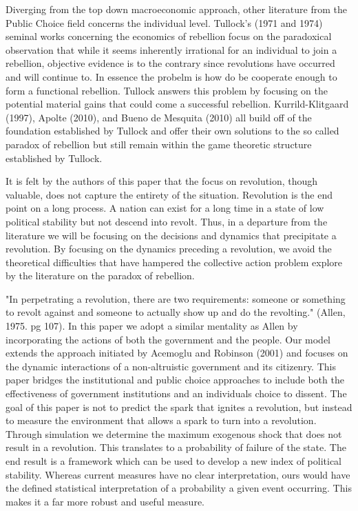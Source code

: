 \documentclass[12pt]{article}
\begin{document}
\begin{spacing}{1.5}
Diverging from the top down macroeconomic approach, other literature from the Public Choice field concerns the individual level. Tullock's (1971 and 1974) seminal works concerning the economics of rebellion focus on the paradoxical observation that while it seems inherently irrational for an individual to join a rebellion, objective evidence is to the contrary since revolutions have occurred and will continue to. In essence the probelm is how do be cooperate enough to form a functional rebellion. Tullock answers this problem by focusing on the potential material gains that could come a successful rebellion. Kurrild-Klitgaard (1997), Apolte (2010), and Bueno de Mesquita (2010) all build off of the foundation established by Tullock and offer their own solutions to the so called paradox of rebellion but still remain within the game theoretic structure established by Tullock. 

It is felt by the authors of this paper that the focus on revolution, though valuable, does not capture the entirety of the situation. Revolution is the end point on a long process. A nation can exist for a long time in a state of low political stability but not descend into revolt. Thus, in a departure from the literature we will be focusing on the decisions and dynamics that precipitate a revolution. By focusing on the dynamics preceding a revolution, we avoid the theoretical difficulties that have hampered the collective action problem explore by the literature on the paradox of rebellion.  


"In perpetrating a revolution, there are two requirements: someone or something to revolt against and someone to actually show up and do the revolting." (Allen, 1975. pg 107). In this paper we adopt a similar mentality as Allen by incorporating the actions of both the government and the people. Our model extends the approach initiated by Acemoglu and Robinson (2001) and focuses on the dynamic interactions of a non-altruistic government and its citizenry. This paper bridges the institutional and public choice approaches to include both the effectiveness of government institutions and an individuals choice to dissent. The goal of this paper is not to predict the spark that ignites a revolution, but instead to measure the environment that allows a spark to turn into a revolution. Through simulation we determine the maximum exogenous shock that does not result in a revolution. This translates to a probability of failure of the state. The end result is a framework which can be used to develop a new index of political stability. Whereas current measures have no clear interpretation, ours would have the defined statistical interpretation of a probability a given event occurring. This makes it a far more robust and useful measure.    




\end{spacing}
\end{document}
